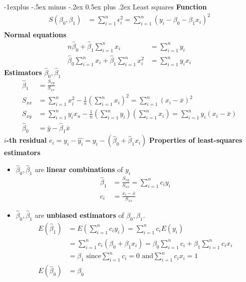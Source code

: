 \documentclass[frenchspacing,9pt,landscape,a4paper]{article}
\makeatletter
\renewcommand{\subsection}{\@startsection{subsection}{2}{0mm}%
                                {-1explus -.5ex minus -.2ex}%
                                {0.5ex plus .2ex}%
                                {\normalfont\normalsize\bfseries}}
\makeatother
\begin{document}
\begin{multicols}{3}
\subsection{Least squares}
\textbf{Function}
\begin{align*}
	S(\beta_0,\beta_1)&=\sum_{i=1}^n\epsilon_i^2=\sum_{i=1}^n(y_i-\beta_0-\beta_1 x_i)^2\\	
\end{align*}
\textbf{Normal equations}
\begin{align*}
	n\hat{\beta}_0+\hat{\beta}_1\sum_{i=1}^n x_i&=\sum_{i=1}^n y_i\\
	\hat{\beta}_0\sum_{i=1}^n x_i+\hat{\beta}_1\sum_{i=1}^n x_i^2&=\sum_{i=1}^n y_ix_i
\end{align*}
\textbf{Estimators} $\hat{\beta}_0, \hat{\beta}_1$
\begin{align*}
	\hat{\beta}_1&=\frac{S_{xy}}{S_{xx}}\\
	S_{xx}&=\sum_{i=1}^n x_i^2-\frac{1}{n}\left(\sum_{i=1}^n x_i\right)^2=\sum_{i=1}^n(x_i-\bar{x})^2\\
	S_{xy}&=\sum_{i=1}^n y_ix_u-\frac{1}{n}\left(\sum_{i=1}^n y_i\right)\left(\sum_{i=1}^n x_i\right)=\sum_{i=1}^n y_i(x_i-\bar{x})\\
	\hat{\beta}_0&=\bar{y}-\hat{\beta}_1\bar{x}
\end{align*}
$i$\textbf{-th residual}  $e_i=y_i-\hat{y_i}=y_i-(\hat{\beta}_0+\hat{\beta}_1x_i)$
\textbf{Properties of least-squares estimators}
\begin{itemize}
	\item $\hat{\beta}_0,\hat{\beta}_1$ are \textbf{linear combinations} of $y_i$
		\begin{align*}
			\hat{\beta}_1&=\frac{S_{xy}}{S_{xx}}=\sum_{i=1}^n c_iy_i\\
			c_i&=\frac{x_i-\bar{x}}{S_{xx}}
		\end{align*}
	\item $\hat{\beta}_0,\hat{\beta}_1$ are \textbf{unbiased estimators} of $\beta_0,\beta_1$.
		\begin{align*}
			E(\hat{\beta}_1)&=E\left(\sum_{i=1}^n c_iy_i\right)=\sum_{i=1}^n c_i E(y_i)\\
			&=\sum_{i=1}^n c_i(\beta_0+\beta_1 x_i)=\beta_0\sum_{i=1}^n c_i+\beta_1\sum_{i=1}^n c_i x_i\\
			&=\beta_1\text{ since}\sum_{i=1}^n c_i=0\text{ and} \sum_{i=1}^n c_ix_i=1\\
			E(\hat{\beta}_0)&=\beta_0
		\end{align*}
		\begin{align*}

\end{align*}
\end{itemize}
\end{multicols}
\end{document}
